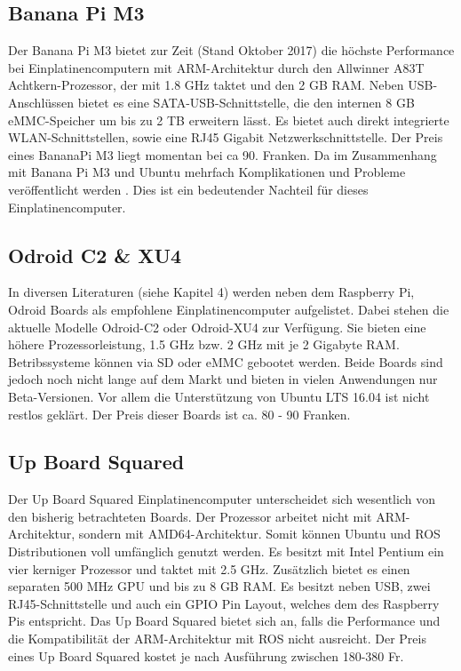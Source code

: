 \subsection{Banana Pi M3}
\label{subsec:BananaPi}
Der Banana Pi M3 bietet zur Zeit (Stand Oktober 2017) die höchste Performance bei Einplatinencomputern mit \ac{ARM}-Architektur durch den Allwinner A83T Achtkern-Prozessor, der mit 1.8 GHz taktet und den 2 GB RAM. Neben USB-Anschlüssen bietet es eine SATA-USB-Schnittstelle, die den internen 8 GB \ac{eMMC}-Speicher um bis zu 2 TB erweitern lässt. Es bietet auch direkt integrierte WLAN-Schnittstellen, sowie eine RJ45 Gigabit Netzwerkschnittstelle. Der Preis eines BananaPi M3 liegt momentan bei ca 90. Franken. Da im Zusammenhang mit Banana Pi M3 und Ubuntu mehrfach Komplikationen und Probleme veröffentlicht werden \cite{rpi} \cite{banana}. Dies ist ein bedeutender Nachteil für dieses Einplatinencomputer. 

\subsection{Odroid C2 \& XU4} 
\label{subsec:Odroid}
In diversen Literaturen (siehe \cite{ROSprojects} Kapitel 4) werden neben dem Raspberry Pi, Odroid Boards als empfohlene Einplatinencomputer aufgelistet. Dabei stehen die aktuelle Modelle Odroid-C2 oder Odroid-XU4 zur Verfügung. Sie bieten eine höhere Prozessorleistung, 1.5 GHz bzw. 2 GHz mit je 2 Gigabyte \ac{RAM}. Betribssysteme können via \ac{SD} oder \ac{eMMC} gebootet werden. Beide Boards sind jedoch noch nicht lange auf dem Markt und bieten in vielen Anwendungen nur Beta-Versionen. Vor allem die Unterstützung von Ubuntu LTS 16.04 ist nicht restlos geklärt. Der Preis dieser Boards ist ca. 80 - 90 Franken. \cite{rpi}

\subsection{Up Board Squared} 
\label{subsec:Up Board Squared}
Der Up Board Squared Einplatinencomputer unterscheidet sich wesentlich von den bisherig betrachteten Boards. Der Prozessor arbeitet nicht mit ARM-Architektur, sondern mit AMD64-Architektur. Somit können Ubuntu und ROS Distributionen voll umfänglich genutzt werden. Es besitzt mit Intel Pentium ein vier kerniger Prozessor und taktet mit 2.5 GHz. Zusätzlich bietet es einen separaten 500 MHz \ac{GPU} und bis zu 8 GB \ac{RAM}. Es besitzt neben USB, zwei RJ45-Schnittstelle und auch ein GPIO Pin Layout, welches dem des Raspberry Pis entspricht. Das Up Board Squared bietet sich an, falls die Performance und die Kompatibilität der ARM-Architektur mit ROS nicht ausreicht. Der Preis eines Up Board Squared kostet je nach Ausführung zwischen 180-380 Fr.

